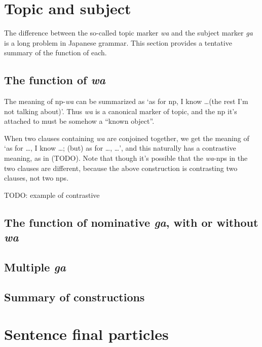 \documentclass[UTF8, a4paper, oneside, scheme=plain]{ctexrep}
\newcommand{\corpus}[1]{\emph{#1}}
\newcommand{\translate}[1]{`#1'}
\begin{document}
\section{Topic and subject}\label{sec:topic-subject}

The difference between the so-called topic marker \corpus{wa} and the subject marker \corpus{ga}
is a long problem in Japanese grammar.
This section provides a tentative summary of the function of each.

\subsection{The function of \corpus{wa}}\label{sec:wa-topic}

The meaning of \ac{np}-\corpus{wa} can be summarized as 
\translate{as for \ac{np}, I know \dots (the rest I'm not talking about)}.
Thus \corpus{wa} is a canonical marker of topic,
and the \ac{np} it's attached to must be somehow a ``known object''.

When two clauses containing \corpus{wa} are conjoined together,
we get the meaning of 
\translate{as for \dots, I know \dots; (but) as for \dots, \dots},
and this naturally has a contrastive meaning, as in (TODO).
Note that though it's possible that the \corpus{wa}-\ac{np}s in the two clauses are different,
because the above construction is contrasting two clauses, not two \ac{np}s.

\begin{exe}
    \ex TODO: example of contrastive  
\end{exe}

\subsection{The function of nominative \corpus{ga}, with or without \corpus{wa}} 

\subsection{Multiple \corpus{ga}}\label{sec:multiple-ga}

\subsection{Summary of constructions}\label{sec:wa-ga-template}

\section{Sentence final particles}\label{sec:sfp}
\end{document}
